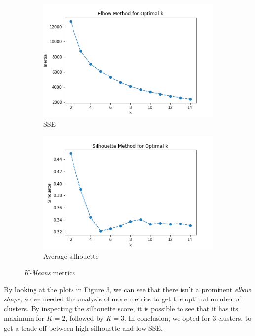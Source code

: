\begin{figure}[h!]
     \captionsetup{justification=centering}		
     \centering
     \begin{subfigure}{0.49\textwidth}
         \centering
	 \captionsetup{type=figure}
         \includegraphics[width=\textwidth]{img/clustering/sse.png}
         \caption{SSE}
         \label{fig:sse_img}
     \end{subfigure}
     \begin{subfigure}{0.49\textwidth}
         \centering
         \includegraphics[width=\textwidth]{img/clustering/sil.png}
         \caption{Average silhouette}
         \label{fig:sil_img}
     \end{subfigure}
     \caption{\emph{K-Means} metrics}
    \label{fig:km_metrics}
\end{figure}

By looking at the plots in Figure \ref{fig:km_metrics}, we can see that there isn't a prominent \emph{elbow shape}, so we needed the analysis of more metrics to get the optimal number of clusters. By inspecting the silhouette score, it is possible to see that it has its maximum for $K = 2$, followed by $K = 3$. In conclusion, we opted for 3 clusters, to get a trade off between high silhouette and low SSE.


